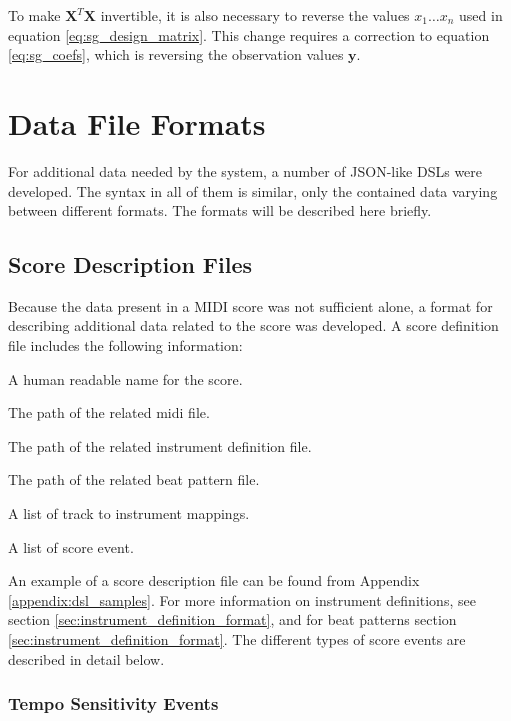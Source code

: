 To make $\mathbf{X}^T \mathbf{X}$ invertible,
it is also necessary to reverse the values $x_1 \ldots x_n$
used in equation \ref{eq:sg_design_matrix}.
This change requires a correction to equation \ref{eq:sg_coefs},
which is reversing the observation values $\mathbf{y}$.

\section{Data File Formats}

For additional data needed by the system,
a number of JSON-like \cite{JSON} DSLs were developed.
The syntax in all of them is similar,
only the contained data varying between different formats.
The formats will be described here briefly.

\subsection{Score Description Files}
\label{sec:score_description_file}

Because the data present in a MIDI score was
not sufficient alone, a format
for describing additional data related to the score was developed.
A score definition file includes the following information:
\begin{description}[leftmargin=24ex]
\item[Name] A human readable name for the score.
\item[MIDI file] The path of the related midi file.
\item[Instrument file] The path of the related instrument definition file.
\item[Beat pattern file] The path of the related beat pattern file.
\item[Track information] A list of track to instrument mappings.
\item[Score events] A list of score event.
\end{description}
An example of a score description file can be found from Appendix \ref{appendix:dsl_samples}.
For more information on instrument definitions,
see section \ref{sec:instrument_definition_format},
and for beat patterns section \ref{sec:instrument_definition_format}.
The different types of score events are described in detail below.

\subsubsection*{Tempo Sensitivity Events}

